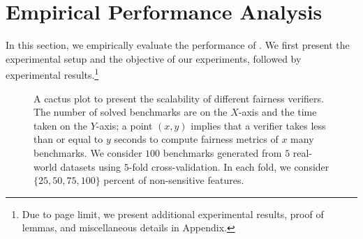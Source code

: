 \section{Empirical Performance Analysis}
\label{fairness_fvgm_sec:experiments}
In this section, we empirically evaluate the performance of {\fvgm}. We first present the experimental setup and the objective of our experiments, followed by experimental results.\footnote{Due to page limit, we present additional experimental results, proof of lemmas, and miscellaneous details in Appendix.}

\begin{figure}[t!]
	\begin{center}		
	\end{center}
	\caption{\footnotesize A cactus plot to present the scalability of different fairness verifiers. The number of solved benchmarks are on the $ X $-axis and the time taken on the $ Y $-axis; a point $ (x,y) $ implies that a verifier takes less than or equal to $ y $ seconds to compute fairness metrics of $ x $ many benchmarks. We consider $ 100 $ benchmarks generated from $ 5 $ real-world datasets using $ 5 $-fold cross-validation. In each fold, we consider $\{25, 50, 75, 100\} $ percent of non-sensitive features.}\label{fairness_fvgm_fig:scalability_exp}
\end{figure}

